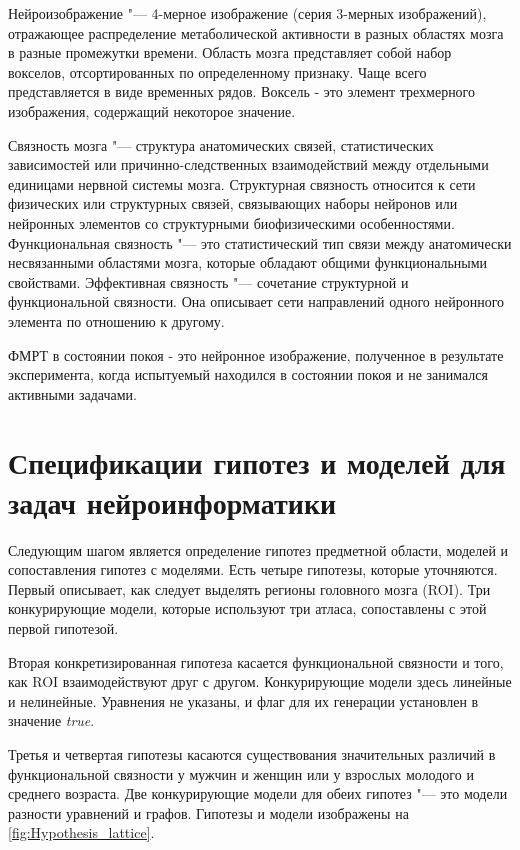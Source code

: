 Нейроизображение "--- 4-мерное изображение (серия 3-мерных изображений), отражающее распределение метаболической активности в разных областях мозга в разные промежутки времени. Область мозга представляет собой набор вокселов, отсортированных по определенному признаку. Чаще всего представляется в виде временных рядов. Воксель - это элемент трехмерного изображения, содержащий некоторое значение.

Связность мозга "--- структура анатомических связей, статистических зависимостей или причинно-следственных взаимодействий между отдельными единицами нервной системы мозга. Структурная связность относится к сети физических или структурных связей, связывающих наборы нейронов или нейронных элементов со структурными биофизическими особенностями. Функциональная связность "--- это статистический тип связи между анатомически несвязанными областями мозга, которые обладают общими функциональными свойствами. Эффективная связность "--- сочетание структурной и функциональной связности. Она описывает сети направлений одного нейронного элемента по отношению к другому.

ФМРТ в состоянии покоя - это нейронное изображение, полученное в результате эксперимента, когда испытуемый находился в состоянии покоя и не занимался активными задачами.

\section{Спецификации гипотез и моделей для задач нейроинформатики}\label{sect_5_2}

Следующим шагом является определение гипотез предметной области, моделей и сопоставления гипотез с моделями. Есть четыре гипотезы, которые уточняются. Первый описывает, как следует выделять регионы головного мозга (ROI). Три конкурирующие модели, которые используют три атласа, сопоставлены с этой первой гипотезой. 

Вторая конкретизированная гипотеза касается функциональной связности и того, как ROI взаимодействуют друг с другом. Конкурирующие модели здесь линейные и нелинейные. Уравнения не указаны, и флаг для их генерации установлен в значение \textit{true}. 

Третья и четвертая гипотезы касаются существования значительных различий в функциональной связности у мужчин и женщин или у взрослых молодого и среднего возраста. Две конкурирующие модели для обеих гипотез "--- это модели разности уравнений и графов. Гипотезы и модели изображены на \cref{fig:Hypothesis_lattice}.

